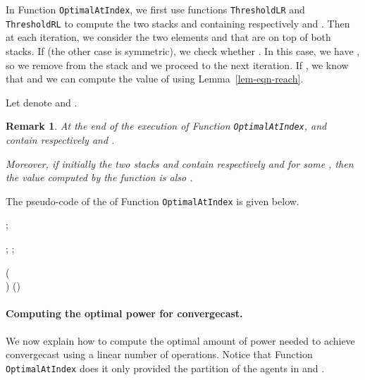 \documentclass{article}
\newtheorem{remark}{Remark}
\newcommand\CompThLR{\mbox{{\tt ThresholdLR}}\xspace}
\newcommand\CompOptimalPos{{{\tt Optimal\-At\-Index}}\xspace}
\newcommand\CompThRL{\mbox{{\tt ThresholdRL}}\xspace}
\newcommand\convergecast{convergecast\xspace}
\begin{document}
In Function \CompOptimalPos, we first use functions \CompThLR and \CompThRL to
compute the two stacks  and 
containing respectively  and
.  Then at each iteration,
we consider the two elements  and  that are
on top of both stacks. If  (the other case is
symmetric), we check whether .  In this case, we have , so we
remove  from the stack  and we proceed
to the next iteration.  If , we know that  and we can compute the value of  using
Lemma~\ref{lem-eqn-reach}.




Let  denote  and .

\begin{remark}\label{rem-atpos}
At the end of the execution of Function \CompOptimalPos,
 and  contain respectively
 and .

Moreover, if initially the two stacks  and
 contain respectively  and
 for some , then the value computed by
the function is also  .
\end{remark}

The pseudo-code of the of Function \CompOptimalPos is given below. 



\begin{function}[h!]
\caption{OptimalAtIndex (array {} of real;
  r:integer):stack \label{algo:cmptTH}}   
  
 

; \; 


; ;
\;

\While(\\ ){}  
      {
        \lIf{}
            {
              }
        \lElse{
              }
        \;    
      }      
      \; 
\Return()\; 
\end{function}


\paragraph{Computing the optimal power for \convergecast.}

We now explain how to compute the optimal amount of power needed to
achieve {\convergecast} using a linear number of operations. Notice that
Function \CompOptimalPos does it only provided the partition of the agents
in  and .
\end{document}
